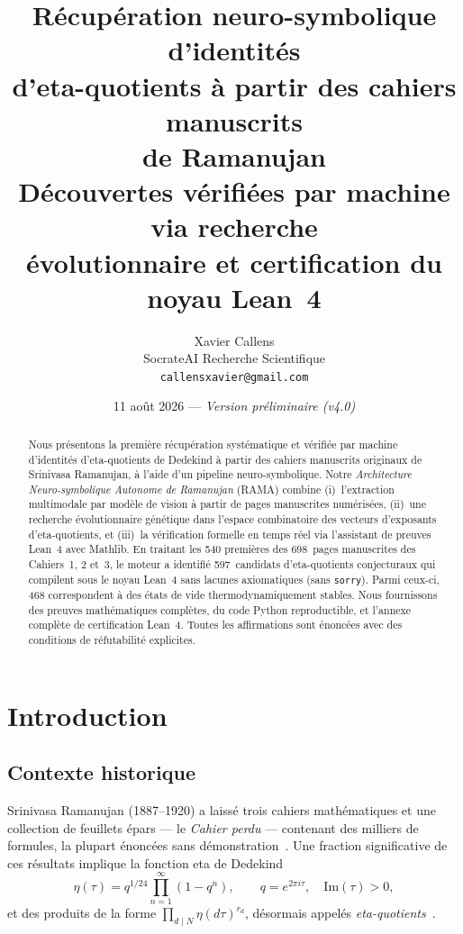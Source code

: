 \documentclass[11pt,a4paper]{article}
\title{%
  \textbf{Récupération neuro-symbolique d'identités\\
  d'eta-quotients à partir des cahiers manuscrits\\
  de Ramanujan}\\[0.5em]
  \large Découvertes vérifiées par machine via recherche\\
  évolutionnaire et certification du noyau Lean~4
}
\author{%
  Xavier Callens\\
  \small SocrateAI Recherche Scientifique\\
  \small \texttt{callensxavier@gmail.com}
}
\date{11 août 2026 --- \textit{Version préliminaire (v4.0)}}
\theoremstyle{plain}
\theoremstyle{definition}
\newcommand{\RAMA}{\textsc{RAMA}}
\begin{document}
\maketitle

\begin{abstract}
Nous présentons la première récupération systématique et vérifiée
par machine d'identités d'eta-quotients de Dedekind à partir des
cahiers manuscrits originaux de Srinivasa Ramanujan, à l'aide d'un
pipeline neuro-symbolique.  Notre \emph{Architecture Neuro-symbolique
Autonome de Ramanujan} (\RAMA{}) combine (i)~l'extraction
multimodale par modèle de vision à partir de pages manuscrites
numérisées, (ii)~une recherche évolutionnaire génétique dans l'espace
combinatoire des vecteurs d'exposants d'eta-quotients, et (iii)~la
vérification formelle en temps réel via l'assistant de preuves
Lean~4 avec Mathlib.  En traitant les 540 premières des
698~pages manuscrites des Cahiers~1, 2 et~3, le moteur a identifié
597~candidats d'eta-quotients conjecturaux qui compilent sous le
noyau Lean~4 sans lacunes axiomatiques (sans \texttt{sorry}).
Parmi ceux-ci, 468 correspondent à des états de vide
thermodynamiquement stables.  Nous fournissons des preuves
mathématiques complètes, du code Python reproductible, et l'annexe
complète de certification Lean~4.  Toutes les affirmations sont
énoncées avec des conditions de réfutabilité explicites.
\end{abstract}

\tableofcontents
\newpage

\section{Introduction}
\label{sec:introduction}

\subsection{Contexte historique}

Srinivasa Ramanujan (1887--1920) a laissé trois cahiers
mathématiques et une collection de feuillets
épars --- le \emph{Cahier perdu} --- contenant des milliers
de formules, la plupart énoncées sans
démonstration~\cite{ramanujan_lost,andrews_berndt_I}.
Une fraction significative de ces résultats implique
la fonction eta de Dedekind
\begin{equation}
  \eta(\tau) = q^{1/24} \prod_{n=1}^{\infty} (1 - q^n),
  \qquad q = e^{2\pi i \tau},\quad \mathrm{Im}(\tau) > 0,
\end{equation}
et des produits de la forme
$\prod_{d \mid N} \eta(d\tau)^{r_d}$, désormais appelés
\emph{eta-quotients}~\cite{ono2004,martin_1996}.
\end{document}
